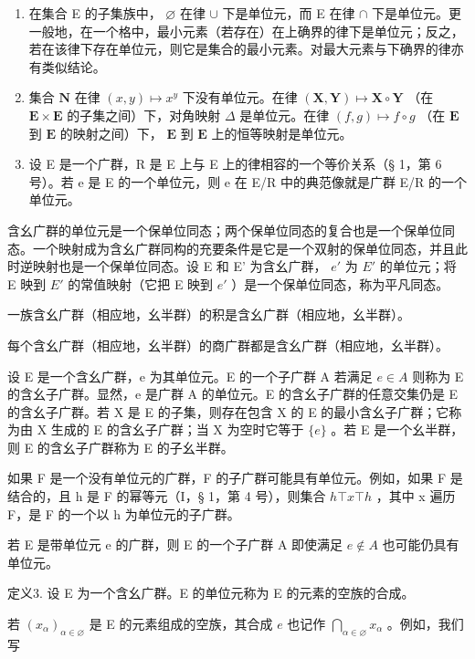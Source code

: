 \begin{enumerate}
\def\labelenumi{(\arabic{enumi})}
\setcounter{enumi}{1}
\item
  在集合 E 的子集族中， \(\varnothing\) 在律 \(\cup\) 下是单位元，而 E 在律 \(\cap\) 下是单位元。更一般地，在一个格中，最小元素（若存在）在上确界的律下是单位元；反之，若在该律下存在单位元，则它是集合的最小元素。对最大元素与下确界的律亦有类似结论。
\item
  集合 \(\mathbf{N}\) 在律 \((x, y) \mapsto x^y\) 下没有单位元。在律 \((\mathbf{X}, \mathbf{Y}) \mapsto \mathbf{X} \circ \mathbf{Y}\) （在 \(\mathbf{E} \times \mathbf{E}\) 的子集之间）下，对角映射 \(\Delta\) 是单位元。在律 \((f, g) \mapsto f \circ g\) （在 \(\mathbf{E}\) 到 \(\mathbf{E}\) 的映射之间）下， \(\mathbf{E}\) 到 \(\mathbf{E}\) 上的恒等映射是单位元。
\item
  设 E 是一个广群，R 是 E 上与 E 上的律相容的一个等价关系（§ 1，第 6 号）。若 e 是 E 的一个单位元，则 e 在 E/R 中的典范像就是广群 E/R 的一个单位元。
\end{enumerate}

含幺广群的单位元是一个保单位同态；两个保单位同态的复合也是一个保单位同态。一个映射成为含幺广群同构的充要条件是它是一个双射的保单位同态，并且此时逆映射也是一个保单位同态。设 E 和 E' 为含幺广群， \(e'\) 为 \(E'\) 的单位元；将 E 映到 \(E'\) 的常值映射（它把 E 映到 \(e'\) ）是一个保单位同态，称为平凡同态。

一族含幺广群（相应地，幺半群）的积是含幺广群（相应地，幺半群）。

每个含幺广群（相应地，幺半群）的商广群都是含幺广群（相应地，幺半群）。

设 E 是一个含幺广群，e 为其单位元。E 的一个子广群 A 若满足 \(e \in A\) 则称为 E 的含幺子广群。显然，e 是广群 A 的单位元。E 的含幺子广群的任意交集仍是 E 的含幺子广群。若 X 是 E 的子集，则存在包含 X 的 E 的最小含幺子广群；它称为由 X 生成的 E 的含幺子广群；当 X 为空时它等于 \(\{e\}\) 。若 E 是一个幺半群，则 E 的含幺子广群称为 E 的子幺半群。

如果 F 是一个没有单位元的广群，F 的子广群可能具有单位元。例如，如果 F 是结合的，且 h 是 F 的幂等元（I，§ 1，第 4 号），则集合 \(h \top x \top h\) ，其中 x 遍历 F，是 F 的一个以 h 为单位元的子广群。

若 E 是带单位元 e 的广群，则 E 的一个子广群 A 即使满足 \(e \notin A\) 也可能仍具有单位元。

定义3. 设 E 为一个含幺广群。E 的单位元称为 E 的元素的空族的合成。

若 \((x_{\alpha})_{\alpha \in \varnothing}\) 是 E 的元素组成的空族，其合成 \(e\) 也记作 \(\bigcap_{\alpha \in \varnothing} x_{\alpha}\) 。例如，我们写

